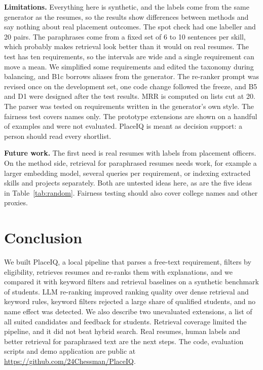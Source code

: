 \documentclass[conference]{IEEEtran}
\begin{document}
\textbf{Limitations.} Everything here is synthetic, and the labels come from the same generator as the resumes, so the results show differences between methods and say nothing about real placement outcomes. The spot check had one labeller and 20 pairs. The paraphrases come from a fixed set of 6 to 10 sentences per skill, which probably makes retrieval look better than it would on real resumes. The test has ten requirements, so the intervals are wide and a single requirement can move a mean. We simplified some requirements and edited the taxonomy during balancing, and B1c borrows aliases from the generator. The re-ranker prompt was revised once on the development set, one code change followed the freeze, and B5 and D1 were designed after the test results. MRR is computed on lists cut at 20. The parser was tested on requirements written in the generator's own style. The fairness test covers names only. The prototype extensions are shown on a handful of examples and were not evaluated. PlaceIQ is meant as decision support: a person should read every shortlist.

\textbf{Future work.} The first need is real resumes with labels from placement officers. On the method side, retrieval for paraphrased resumes needs work, for example a larger embedding model, several queries per requirement, or indexing extracted skills and projects separately. Both are untested ideas here, as are the five ideas in Table~\ref{tab:random}. Fairness testing should also cover college names and other proxies.

\section{Conclusion}
We built PlaceIQ, a local pipeline that parses a free-text requirement, filters by eligibility, retrieves resumes and re-ranks them with explanations, and we compared it with keyword filters and retrieval baselines on a synthetic benchmark of \NStudents{} students. LLM re-ranking improved ranking quality over dense retrieval and keyword rules, keyword filters rejected a large share of qualified students, and no name effect was detected. We also describe two unevaluated extensions, a list of all suited candidates and feedback for students. Retrieval coverage limited the pipeline, and it did not beat hybrid search. Real resumes, human labels and better retrieval for paraphrased text are the next steps. The code, evaluation scripts and demo application are public at \url{https://github.com/24Chessman/PlaceIQ}.





\end{document}
